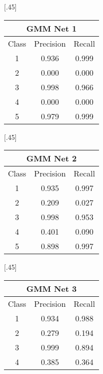 \begin{table}[ht]
	\renewcommand{\arraystretch}{1.4}
	\centering
	[.45\linewidth]{
		\begin{tabular}{|c|c|c|}
			\hline
			\multicolumn{3}{|c|}{\textbf{GMM Net 1}} \\ \hline
			Class      & Precision      & Recall     \\ \hline
			1          & 0.936          & 0.999      \\ \hline
			2          & 0.000          & 0.000      \\ \hline
			3          & 0.998          & 0.966      \\ \hline
			4          & 0.000          & 0.000      \\ \hline
			5          & 0.979          & 0.999      \\ \hline
		\end{tabular}
	}
	[.45\linewidth]{
		\begin{tabular}{|c|c|c|}
			\hline
			\multicolumn{3}{|c|}{\textbf{GMM Net 2}} \\ \hline
			Class      & Precision      & Recall     \\ \hline
			1          & 0.935          & 0.997      \\ \hline
			2          & 0.209          & 0.027      \\ \hline
			3          & 0.998          & 0.953      \\ \hline
			4          & 0.401          & 0.090      \\ \hline
			5          & 0.898          & 0.997      \\ \hline
		\end{tabular}
	}
	[.45\linewidth]{
		\begin{tabular}{|c|c|c|}
			\hline
			\multicolumn{3}{|c|}{\textbf{GMM Net 3}} \\ \hline
			Class      & Precision      & Recall     \\ \hline
			1          & 0.934          & 0.988      \\ \hline
			2          & 0.279          & 0.194      \\ \hline
			3          & 0.999          & 0.894      \\ \hline
			4          & 0.385          & 0.364      \\ \hline

\end{tabular}}
\end{table}
